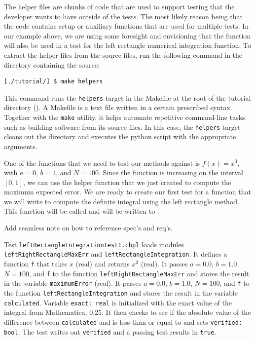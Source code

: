 \begin{seamlessnote}
  The helper files are chunks of code that are used to support
  testing that the developer wants to have outside of the tests. The most likely 
  reason being that
  the code contains setup or auxiliary functions that are used for multiple tests. In 
  our example
  above, we are using some foresight and envisioning that the 
  function will also be used in a test for the left rectangle numerical integration function. 
  To extract the helper files from the \latex source files, run the following command in the 
  directory containing the source:
\begin{verbatim}
[./tutorial/] $ make helpers
\end{verbatim}
  This command runs the \texttt{helpers} target in the Makefile at the root of the 
  tutorial directory (). A Makefile is a text 
  file written in a certain prescribed syntax. Together with the \texttt{make} utility, it 
  helps automate repetitive command-line tasks such as building software from its source files. 
  In this case, the \texttt{helpers} target cleans out the  directory and
  executes the  python script with the appropriate arguments.
\end{seamlessnote}

One of the functions that we need to test our methods against is $f(x) = x^3$, 
with $a=0$, $b=1$, and $N=100$.
Since the function is increasing on the interval $[0,1]$, we can use 
the helper function that we just created to compute the maximum expected error. We are
ready to create our first test for a function that we will write to compute the definite
integral using the left rectangle method. This function will be called 
and will be written to .
  \begin{TODO}
    Add seamless note on how to reference spec's and req's.
  \end{TODO}

  \begin{enumspec}
  \item{}
    Test \lstinline{leftRectangleIntegrationTest1.chpl} loads modules
    \texttt{leftRightRectangleMaxErr} and
    \lstinline[breaklines=true]{leftRectangleIntegration}.
    It defines a function \lstinline{f} that takes $x$ (real) and returns $x^3$ (real).
    It passes $a=0.0$, $b=1.0$, $N=100$, and \lstinline{f} to the function
    \lstinline{leftRightRectangleMaxErr} and stores the result in the variable
    \lstinline{maximumError} (real).
    It passes $a=0.0$, $b=1.0$, $N=100$, and \lstinline{f} to the function
    \lstinline{leftRectangleIntegration} and stores the result in the variable
    \lstinline{calculated}.
    Variable \lstinline{exact: real} is initialized with the exact value of the integral from
    Mathematica, 0.25.
    It then checks to see if the absolute value of the difference between \lstinline{calculated} 
    and  is less than or equal to  and sets 
    \lstinline{verified: bool}. The test writes out \lstinline{verified} and a passing
    test results in \lstinline{true}.
  \end{enumspec}


